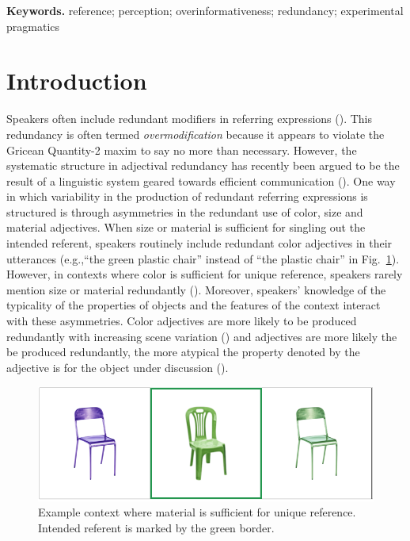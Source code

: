 \documentclass[12pt,letterpaper]{article}
\newenvironment{keywords}{%
\vspace{.5em}
\noindent\begin{minipage}{1\textwidth}
\setlength{\leftskip}{0.4in}
\setlength{\rightskip}{0.4in}
\textbf{Keywords.}}
{\end{minipage}}
\begin{document}
\begin{keywords} %
reference; perception; overinformativeness; redundancy; experimental pragmatics
\end{keywords}

\section{Introduction} 

Speakers often include redundant modifiers in referring expressions  (\citealt{Pechmann1989,GattEtAl2011,ArtsEtAl2011,KoolenEtAl2013}). This redundancy is often termed \emph{overmodification} because it appears to violate the Gricean Quantity-2 maxim to say no more than necessary. However, the systematic structure in  adjectival redundancy has recently been argued to be the result of a linguistic system geared towards efficient communication (\citealt{DegenEtAl2020,RubioEtAl2019}). One way in which variability in the production of redundant referring expressions is structured is through asymmetries in the redundant use of color, size and material adjectives. When size or material is sufficient for singling out the intended referent, speakers routinely include redundant color adjectives in their utterances (e.g.,``the green plastic chair'' instead of ``the plastic chair'' in Fig.~\ref{fig:chairs}). However, in contexts where color is sufficient for unique reference, speakers rarely mention size or material redundantly (\citealt{Pechmann1989, Sedivy2003, GattEtAl2011, RubioFernandez2016, DegenEtAl2020}). Moreover, speakers' knowledge of the typicality of the properties of objects and the features of the context interact with these asymmetries. Color adjectives are more likely to be produced redundantly with increasing scene variation (\citealt{DegenEtAl2020, DaviesKatsos2013, KoolenEtAl2013}) and adjectives are more likely the be produced redundantly, the more atypical the property denoted by the adjective is for the object under discussion (\citealt{DegenEtAl2020, WesterbeekEtAl2015, Mitchell2013}).

\begin{figure}[ht]
   \centering
   \includegraphics[width=.7\textwidth]{img/chairs.png}
   \caption{Example context where material is sufficient for unique reference. Intended referent is marked by the green border.}
   \label{fig:chairs}
\end{figure}
\end{document}
